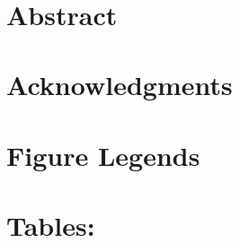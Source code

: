 \documentclass[10pt]{article}
\date{}
\begin{document}
\begin{flushleft}
{\Large
\textbf{}
}
\bigskip\\

\end{flushleft}

\section*{Abstract}







\section*{Acknowledgments}





\clearpage

\section*{Figure Legends}

\clearpage



\clearpage

\section*{Tables:}
 
\end{document}
